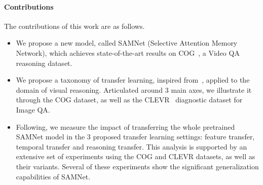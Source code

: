 \paragraph{Contributions}
The contributions of this work are as follows.
\begin{itemize}
	\compresslist
	\item We propose a new model, called SAMNet (Selective Attention Memory Network), which achieves state-of-the-art results on COG~\cite{yang2018dataset}, a Video QA reasoning dataset.
	\item We propose a taxonomy of transfer learning, inspired from~\cite{pan2009survey}, applied to the domain of visual reasoning. Articulated around 3 main axes, we illustrate it through the COG dataset, as well as the CLEVR~\cite{johnson2017clevr} diagnostic dataset for Image QA.
	\item Following, we measure the impact of transferring the whole pretrained SAMNet model in the 3 proposed transfer learning settings: feature transfer, temporal transfer and reasoning transfer. This analysis is supported by an extensive set of experiments using the COG and CLEVR datasets, as well as their variants. Several of these experiments show the significant generalization capabilities of SAMNet.
\end{itemize}


